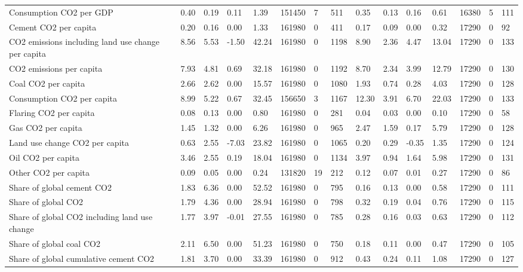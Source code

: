 \begin{longtable}{lllllllllllllll}
Consumption CO2 per GDP & 0.40 & 0.19 & 0.11 & 1.39 & 151450 & 7 & 511 & 0.35 & 0.13 & 0.16 & 0.61 & 16380 & 5 & 111\\
\addlinespace
Cement CO2 per capita & 0.20 & 0.16 & 0.00 & 1.33 & 161980 & 0 & 411 & 0.17 & 0.09 & 0.00 & 0.32 & 17290 & 0 & 92\\
CO2 emissions including land use change per capita & 8.56 & 5.53 & -1.50 & 42.24 & 161980 & 0 & 1198 & 8.90 & 2.36 & 4.47 & 13.04 & 17290 & 0 & 133\\
CO2 emissions per capita & 7.93 & 4.81 & 0.69 & 32.18 & 161980 & 0 & 1192 & 8.70 & 2.34 & 3.99 & 12.79 & 17290 & 0 & 130\\
Coal CO2 per capita & 2.66 & 2.62 & 0.00 & 15.57 & 161980 & 0 & 1080 & 1.93 & 0.74 & 0.28 & 4.03 & 17290 & 0 & 128\\
Consumption CO2 per capita & 8.99 & 5.22 & 0.67 & 32.45 & 156650 & 3 & 1167 & 12.30 & 3.91 & 6.70 & 22.03 & 17290 & 0 & 133\\
\addlinespace
Flaring CO2 per capita & 0.08 & 0.13 & 0.00 & 0.80 & 161980 & 0 & 281 & 0.04 & 0.03 & 0.00 & 0.10 & 17290 & 0 & 58\\
Gas CO2 per capita & 1.45 & 1.32 & 0.00 & 6.26 & 161980 & 0 & 965 & 2.47 & 1.59 & 0.17 & 5.79 & 17290 & 0 & 128\\
Land use change CO2 per capita & 0.63 & 2.55 & -7.03 & 23.82 & 161980 & 0 & 1065 & 0.20 & 0.29 & -0.35 & 1.35 & 17290 & 0 & 124\\
Oil CO2 per capita & 3.46 & 2.55 & 0.19 & 18.04 & 161980 & 0 & 1134 & 3.97 & 0.94 & 1.64 & 5.98 & 17290 & 0 & 131\\
Other CO2 per capita & 0.09 & 0.05 & 0.00 & 0.24 & 131820 & 19 & 212 & 0.12 & 0.07 & 0.01 & 0.27 & 17290 & 0 & 86\\
\addlinespace
Share of global cement CO2 & 1.83 & 6.36 & 0.00 & 52.52 & 161980 & 0 & 795 & 0.16 & 0.13 & 0.00 & 0.58 & 17290 & 0 & 111\\
Share of global CO2 & 1.79 & 4.36 & 0.00 & 28.94 & 161980 & 0 & 798 & 0.32 & 0.19 & 0.04 & 0.76 & 17290 & 0 & 115\\
Share of global CO2 including land use change & 1.77 & 3.97 & -0.01 & 27.55 & 161980 & 0 & 785 & 0.28 & 0.16 & 0.03 & 0.63 & 17290 & 0 & 112\\
Share of global coal CO2 & 2.11 & 6.50 & 0.00 & 51.23 & 161980 & 0 & 750 & 0.18 & 0.11 & 0.00 & 0.47 & 17290 & 0 & 105\\
Share of global cumulative cement CO2 & 1.81 & 3.70 & 0.00 & 33.39 & 161980 & 0 & 912 & 0.43 & 0.24 & 0.11 & 1.08 & 17290 & 0 & 127\\

\end{longtable}
